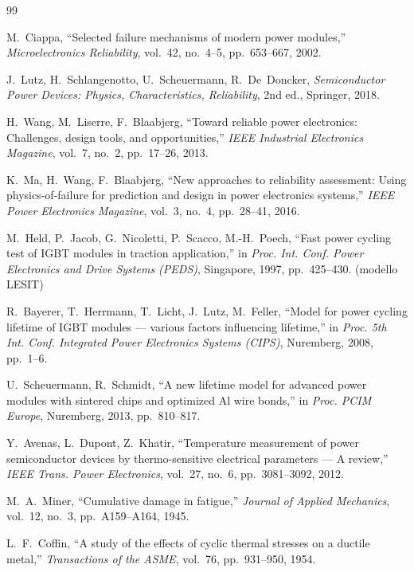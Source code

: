 \documentclass[11pt,a4paper]{article}
\begin{document}
\begin{thebibliography}{99}

M.~Ciappa,
``Selected failure mechanisms of modern power modules,''
\emph{Microelectronics Reliability}, vol.~42, no.~4--5, pp.~653--667, 2002.

J.~Lutz, H.~Schlangenotto, U.~Scheuermann, R.~De~Doncker,
\emph{Semiconductor Power Devices: Physics, Characteristics, Reliability},
2nd ed., Springer, 2018.

H.~Wang, M.~Liserre, F.~Blaabjerg,
``Toward reliable power electronics: Challenges, design tools, and
opportunities,''
\emph{IEEE Industrial Electronics Magazine}, vol.~7, no.~2, pp.~17--26, 2013.

K.~Ma, H.~Wang, F.~Blaabjerg,
``New approaches to reliability assessment: Using physics-of-failure for
prediction and design in power electronics systems,''
\emph{IEEE Power Electronics Magazine}, vol.~3, no.~4, pp.~28--41, 2016.

M.~Held, P.~Jacob, G.~Nicoletti, P.~Scacco, M.-H.~Poech,
``Fast power cycling test of IGBT modules in traction application,''
in \emph{Proc. Int. Conf. Power Electronics and Drive Systems (PEDS)},
Singapore, 1997, pp.~425--430. (modello LESIT)

R.~Bayerer, T.~Herrmann, T.~Licht, J.~Lutz, M.~Feller,
``Model for power cycling lifetime of IGBT modules --- various factors
influencing lifetime,''
in \emph{Proc. 5th Int. Conf. Integrated Power Electronics Systems (CIPS)},
Nuremberg, 2008, pp.~1--6.

U.~Scheuermann, R.~Schmidt,
``A new lifetime model for advanced power modules with sintered chips and
optimized Al wire bonds,''
in \emph{Proc. PCIM Europe}, Nuremberg, 2013, pp.~810--817.

Y.~Avenas, L.~Dupont, Z.~Khatir,
``Temperature measurement of power semiconductor devices by thermo-sensitive
electrical parameters --- A review,''
\emph{IEEE Trans. Power Electronics}, vol.~27, no.~6, pp.~3081--3092, 2012.

M.~A.~Miner,
``Cumulative damage in fatigue,''
\emph{Journal of Applied Mechanics}, vol.~12, no.~3, pp.~A159--A164, 1945.

L.~F.~Coffin,
``A study of the effects of cyclic thermal stresses on a ductile metal,''
\emph{Transactions of the ASME}, vol.~76, pp.~931--950, 1954.


\end{thebibliography}
\end{document}
